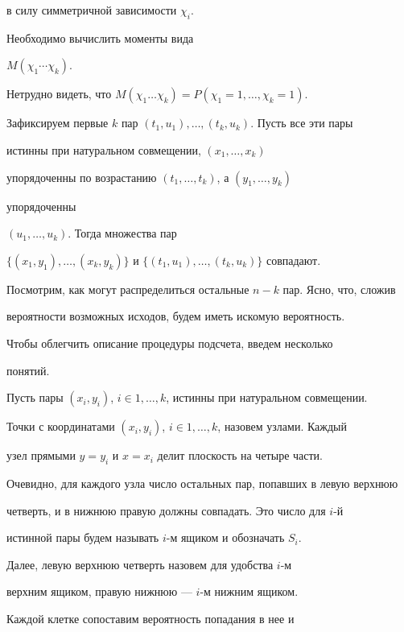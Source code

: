 в силу симметричной зависимости $\chi_i.$


Необходимо вычислить моменты вида


$M(\chi_1\dotsb \chi_k).$





Нетрудно видеть, что $M(\chi_1\dotsc \chi_k)=P(\chi_1=1,\dotsc ,\chi_k=1).$


Зафиксируем первые $k$ пар $(t_1,u_1),\dotsc ,(t_k,u_k).$ Пусть все эти пары


истинны при натуральном совмещении, $(x_1,\dotsc ,x_k)$


упорядоченны по возрастанию $(t_1,\dotsc ,t_k)$, а $(y_1,\dotsc ,y_k)$


упорядоченны 


$(u_1,\dotsc ,u_k)$. Тогда множества пар


$\{(x_1,y_1),\dotsc,(x_k,y_k)\}$ и $\{(t_1,u_1),\dotsc,(t_k,u_k)\}$ совпадают.


Посмотрим, как могут распределиться остальные $n-k$ пар. Ясно, что, сложив


вероятности возможных исходов, будем иметь искомую вероятность.





Чтобы облегчить описание процедуры подсчета, введем несколько


понятий.





Пусть пары $(x_i,y_i)$, $i\in 1,\dotsc ,k$, истинны при натуральном совмещении.


Точки с координатами $(x_i,y_i)$, $i\in1,\dotsc ,k$, назовем узлами. Каждый


узел прямыми $y=y_i$ и $x=x_i$ делит плоскость на четыре части.


Очевидно, для каждого узла число остальных пар, попавших в левую верхнюю


четверть, и в нижнюю правую должны совпадать. Это число для $i$-й


истинной пары будем называть $i$-м ящиком и обозначать $S_i$.


Далее, левую верхнюю четверть назовем для удобства $i$-м


верхним ящиком, правую нижнюю --- $i$-м нижним ящиком.





Каждой клетке сопоставим вероятность попадания в нее и


